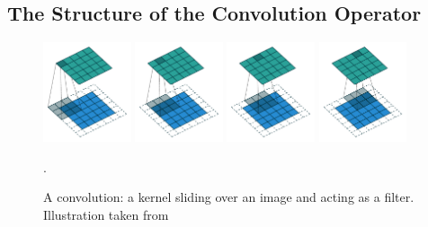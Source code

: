 \subsection{The Structure of the Convolution Operator}
\label{subsection:ch2-the_structure_of_the_convolution_operator}

\begin{figure}[ht]
    \centering
    \includegraphics[width=0.23\textwidth]{figures/main/ch2-background/conv_00.pdf}
    \hfill
    \includegraphics[width=0.23\textwidth]{figures/main/ch2-background/conv_01.pdf}
    \hfill
    \includegraphics[width=0.23\textwidth]{figures/main/ch2-background/conv_02.pdf}
    \hfill
    \includegraphics[width=0.23\textwidth]{figures/main/ch2-background/conv_03.pdf}
    \caption{A convolution: a kernel sliding over an image and acting as a filter. \\Illustration taken from~\citet{dumoulin2016guide}}
    \label{figure:illustration_convolution}.
\end{figure}

